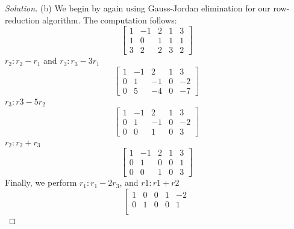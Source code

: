 \documentclass[12pt]{amsart}
\newenvironment{solution}
{\begin{proof}[Solution]}
{\end{proof}}
\begin{document}
\begin{onehalfspace}
\begin{solution}
            (b) We begin by again using Gauss-Jordan elimination for our row-reduction algorithm.
            The computation follows:
            \begin{displaymath}
                \left[\begin{matrix}
                          1 & -1 & 2 & 1 & 3\\
                          1 & 0 & 1 & 1 & 1\\
                          3 & 2 & 2 & 3 & 2
                \end{matrix}\right]
            \end{displaymath}
            $r_2:r_2-r_1$ and $r_3:r_3-3r_1$
            \begin{displaymath}
                \left[\begin{matrix}
                          1 & -1 & 2 & 1 & 3\\
                          0 & 1 & -1 & 0 & -2\\
                          0 & 5 & -4 & 0 & -7
                \end{matrix}\right]
            \end{displaymath}
            $r_3:r3-5r_2$
            \begin{displaymath}
                \left[\begin{matrix}
                          1 & -1 & 2 & 1 & 3\\
                          0 & 1 & -1 & 0 & -2\\
                          0 & 0 & 1 & 0 & 3
                \end{matrix}\right]
            \end{displaymath}
            $r_2:r_2+r_3$
            \begin{displaymath}
                \left[\begin{matrix}
                          1 & -1 & 2 & 1 & 3\\
                          0 & 1 & 0 & 0 & 1\\
                          0 & 0 & 1 & 0 & 3
                \end{matrix}\right]
            \end{displaymath}
            Finally, we perform $r_1:r_1-2r_3$, and $r1:r1+r2$
            \begin{displaymath}
                \left[\begin{matrix}
                          1 & 0 & 0 & 1 & -2\\
                          0 & 1 & 0 & 0 & 1\\

\end{matrix}
\end{displaymath}
\end{solution}
\end{onehalfspace}
\end{document}
